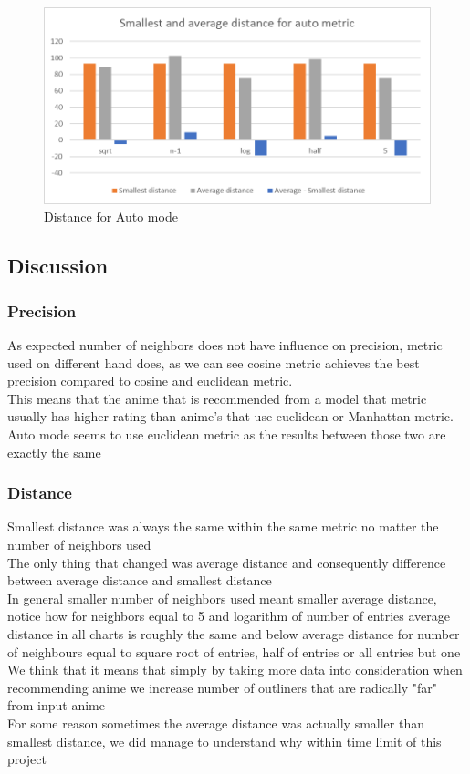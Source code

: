 \documentclass[12pt]{article}
\begin{document}
\begin{figure}[H]
  \caption{Distance for Auto mode}
  \includegraphics[width=\textwidth]{distance_auto.png}
\end{figure}
\subsection{Discussion}
\subsubsection{Precision}
As expected number of neighbors does not have influence on precision, metric used on different hand does, as we can see cosine metric achieves the best precision compared to cosine and euclidean metric. \\ 
This means that the anime that is recommended from a model that metric usually has higher rating than anime's that use euclidean or Manhattan metric. \\
Auto mode seems to use euclidean metric as the results between those two are exactly the same
\subsubsection{Distance}
Smallest distance was always the same within the same metric no matter the number of neighbors used \\ 
The only thing that changed was average distance and consequently difference between average distance and smallest distance \\ 
In general smaller number of neighbors used meant smaller average distance, notice how for neighbors equal to 5 and logarithm of number of entries average distance in all charts is roughly the same and below average distance for number of neighbours equal to square root of entries, half of entries or all entries but one \\ 
We think that it means that simply by taking more data into consideration when recommending anime we increase number of outliners that are radically "far" from input anime \\ 
For some reason sometimes the average distance was actually smaller than smallest distance, we did manage to understand why within time limit of this project \\ 
\end{document}

